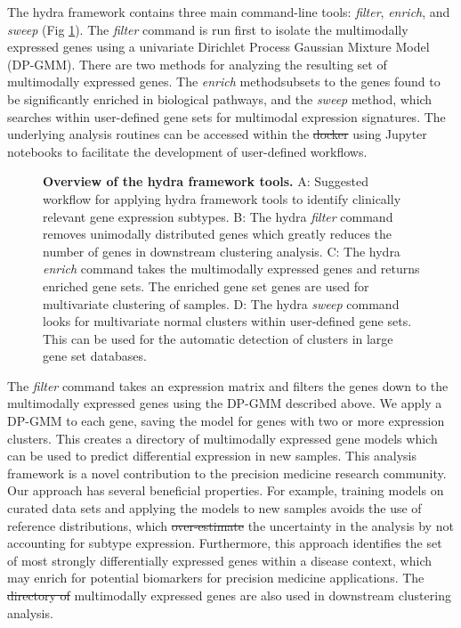 \documentclass[10pt,letterpaper]{article}
\providecommand{\DIFaddtex}[1]{{\protect\color{blue}\uwave{#1}}} %
\providecommand{\DIFdeltex}[1]{{\protect\color{red}\sout{#1}}}                      %
\providecommand{\DIFaddbegin}{} %
\providecommand{\DIFaddend}{} %
\providecommand{\DIFdelbegin}{} %
\providecommand{\DIFdelend}{} %
\providecommand{\DIFadd}[1]{\texorpdfstring{\DIFaddtex{#1}}{#1}} %
\providecommand{\DIFdel}[1]{\texorpdfstring{\DIFdeltex{#1}}{}} %
\newcommand{\DIFscaledelfig}{0.5}
\newlength{\DIFdelgraphicswidth} %
\newlength{\DIFdelgraphicsheight} %
\newcommand{\DIFaddincludegraphics}[2][]{{\color{blue}\fbox{\DIFOincludegraphics[#1]{#2}}}} %
\newcommand{\DIFdelincludegraphics}[2][]{%
\sbox{\DIFdelgraphicsbox}{\DIFOincludegraphics[#1]{#2}}%
\settoboxwidth{\DIFdelgraphicswidth}{\DIFdelgraphicsbox} %
\settoboxtotalheight{\DIFdelgraphicsheight}{\DIFdelgraphicsbox} %
\scalebox{\DIFscaledelfig}{%
\parbox[b]{\DIFdelgraphicswidth}{\usebox{\DIFdelgraphicsbox}\\[-\baselineskip] \rule{\DIFdelgraphicswidth}{0em}}\llap{\resizebox{\DIFdelgraphicswidth}{\DIFdelgraphicsheight}{%
\setlength{\unitlength}{\DIFdelgraphicswidth}%
\begin{picture}(1,1)%
\thicklines\linethickness{2pt} %
{\color[rgb]{1,0,0}\put(0,0){\framebox(1,1){}}}%
{\color[rgb]{1,0,0}\put(0,0){\line( 1,1){1}}}%
{\color[rgb]{1,0,0}\put(0,1){\line(1,-1){1}}}%
\end{picture}%
}\hspace*{3pt}}} %
} %
\DeclareRobustCommand{\DIFaddbegin}{\DIFOaddbegin \let\includegraphics\DIFaddincludegraphics} %
\DeclareRobustCommand{\DIFaddend}{\DIFOaddend \let\includegraphics\DIFOincludegraphics} %
\DeclareRobustCommand{\DIFdelbegin}{\DIFOdelbegin \let\includegraphics\DIFdelincludegraphics} %
\DeclareRobustCommand{\DIFdelend}{\DIFOaddend \let\includegraphics\DIFOincludegraphics} %
\begin{document}
The hydra framework contains three main command-line tools: \textit{filter}, \textit{enrich}, and \textit{sweep} (Fig \ref{overview}). The \textit{filter} command is run first to isolate the multimodally expressed genes using a univariate Dirichlet Process Gaussian Mixture Model (DP-GMM). There are two methods for analyzing the resulting set of multimodally expressed genes. The \textit{enrich} method\DIFaddbegin \DIFadd{, which }\DIFaddend subsets to the genes found to be significantly enriched in biological pathways, and the \textit{sweep} method, which searches within user-defined gene sets for multimodal expression signatures. The underlying analysis routines can be accessed within the \DIFdelbegin \DIFdel{docker }\DIFdelend \DIFaddbegin \DIFadd{Docker }\DIFaddend using Jupyter notebooks to facilitate the development of user-defined workflows.

\begin{figure}[h!]
	\caption{{\bf Overview of the hydra framework tools.}
		A: Suggested workflow for applying hydra framework tools to identify clinically relevant gene expression subtypes. B: The hydra \textit{filter} command removes unimodally distributed genes which greatly reduces the number of genes in downstream clustering analysis. C: The hydra \textit{enrich} command takes the multimodally expressed genes and returns enriched gene sets. The enriched gene set genes are used for multivariate clustering of samples. D: The hydra
	    \textit{sweep} command looks for multivariate normal clusters within user-defined gene sets. This can be used for the automatic detection of clusters in large gene set databases.
		\label{overview}}
\end{figure}

The \textit{filter} command \DIFaddbegin \DIFadd{(Fig \ref{overview}B) }\DIFaddend takes an expression matrix and filters the genes down to the multimodally expressed genes using the DP-GMM described above. We apply a DP-GMM to each gene, saving the model for genes with two or more expression clusters. This creates a directory of multimodally expressed gene models which can be used to predict differential expression in new samples. This analysis framework is a novel contribution to the precision medicine research community. Our approach has several beneficial properties. For example, training models on curated data sets and applying the models to new samples avoids the use of reference distributions, which \DIFdelbegin \DIFdel{over-estimate }\DIFdelend \DIFaddbegin \DIFadd{overestimate }\DIFaddend the uncertainty in the analysis by not accounting for subtype expression. Furthermore, this approach identifies the set of most strongly differentially expressed genes within a disease context, which may enrich for potential biomarkers for precision medicine applications. The \DIFdelbegin \DIFdel{directory of }\DIFdelend multimodally expressed genes are also used in downstream clustering analysis.
\DIFaddbegin 
\end{document}
